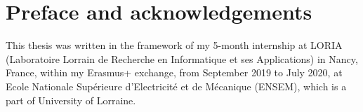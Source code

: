 

% 

\cleardoublepage

\section*{Preface and acknowledgements}

This thesis was written in the framework of my 5-month internship at LORIA (Laboratoire Lorrain de Recherche en Informatique et ses Applications) in Nancy, France, within my Erasmus+ exchange, from September 2019 to July 2020, at Ecole Nationale Supérieure d'Electricité et de Mécanique (ENSEM), which is a part of University of Lorraine.

